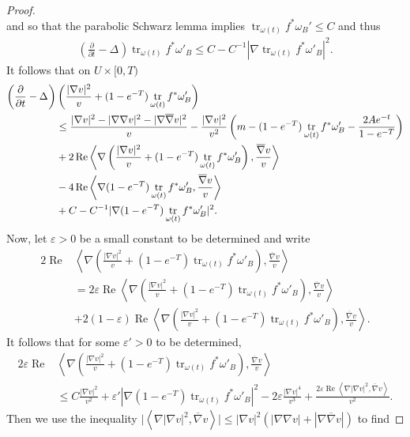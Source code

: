 \documentclass[12pt]{article}
\numberwithin{equation}{section}
\renewcommand{\d}{\partial}
\newcommand{\e}{\varepsilon}
\DeclareMathOperator{\tr}{tr}
\DeclareMathOperator{\Real}{Re}
\newcommand{\oo}[1]{\overline{#1}}
\newcommand{\parabolic}[1]{\left(\frac{\d}{\d t} - \Delta_{#1}\right)}
\newcommand{\ip}[1]{\left\langle#1\right\rangle}
\begin{document}
\begin{proof}
\begin{equation*}
\end{equation*}
and so that the parabolic Schwarz lemma implies $\tr_{\omega(t)} f^*\omega_B' \leq C$ and thus
\begin{align*}
    \parabolic{} \tr_{\omega(t)} f^*\omega'_B \leq C - C^{-1} |\nabla \tr_{\omega(t)} f^*\omega'_B|^2.
\end{align*}
It follows that on $U \times [0,T)$
\begin{align}\label{norm_grad_v_proof_inequality}
    \parabolic{}&\left(\frac{|\nabla v|^2}{v} + (1-e^{-T})\tr_{\omega(t)} f^*\omega'_B\right)\\\notag
    &\leq \frac{|\nabla v|^2 - |\nabla \nabla v|^2 - |\nabla \oo{\nabla} v|^2}{v}- \frac{|\nabla v|^2}{v^2} \left(m-(1-e^{-T})\tr_{\omega(t)} f^*\omega'_B - \frac{2A e^{-t}}{1-e^{-T}}\right)\\\notag
    &+ 2 \Real \ip{\nabla \left(\frac{|\nabla v|^2}{v}+ (1-e^{-T})\tr_{\omega(t)} f^*\omega'_B \right), \frac{\oo{\nabla} v}{v}}\\\notag
    &- 4 \Real \ip{\nabla (1-e^{-T})\tr_{\omega(t)}f^*\omega_B', \frac{\oo{\nabla} v}{v}}\\\notag
    &+ C - C^{-1}|\nabla (1-e^{-T})\tr_{\omega(t)} f^* \omega'_B|^2.\notag
\end{align}
Now, let $\e > 0$ be a small constant to be determined and write
\begin{align*}
    2 \Real &\ip{\nabla \left(\frac{|\nabla v|^2}{v} + (1-e^{-T})\tr_{\omega(t)} f^*\omega'_B \right), \frac{\oo{\nabla} v}{v}}\\ &= 2 \e \Real \ip{\nabla \left(\frac{|\nabla v|^2}{v} + (1-e^{-T})\tr_{\omega(t)} f^*\omega'_B \right), \frac{\oo{\nabla} v}{v}}\\
    &+ 2(1-\e)\Real \ip{\nabla \left(\frac{|\nabla v|^2}{v} + (1-e^{-T})\tr_{\omega(t)} f^*\omega'_B \right), \frac{\oo{\nabla} v}{v}}.
\end{align*}
It follows that for some $\e' > 0$ to be determined,
\begin{align*}
    2 \e \Real &\ip{\nabla \left(\frac{|\nabla v|^2}{v} + (1-e^{-T})\tr_{\omega(t)} f^*\omega'_B \right), \frac{\oo{\nabla} v}{v}}\\ &\leq C \frac{|\nabla v|^2}{v^2} + \e' |\nabla (1-e^{-T})\tr_{\omega(t)} f^*\omega'_B|^2 -2 \e \frac{|\nabla v|^4}{v^3}+ \frac{2\e \Real \ip{\nabla |\nabla v|^2, \oo{\nabla} v}}{v^2}.
\end{align*}
Then we use the inequality $\big|\ip{\nabla |\nabla v|^2, \oo{\nabla} v}\big| \leq |\nabla v|^2 (|\nabla \nabla v| + |\nabla \oo{\nabla} v|)$ to find

\end{proof}
\end{document}

